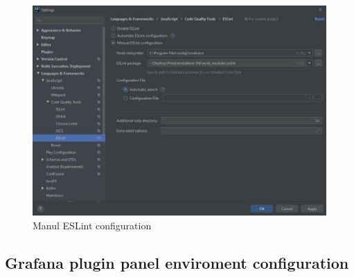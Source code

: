 \begin{figure}[H]
		\centering
		\includegraphics[scale=0.60]{../Developer_manual/img/manual_eslint_configuration.JPG}
		\caption{Manul ESLint configuration}
	\end{figure}	

	
	\subsection{Grafana plugin panel enviroment configuration}
	
	
